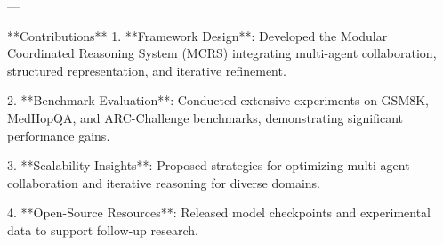 ---

**Contributions**  
1. **Framework Design**: Developed the Modular Coordinated Reasoning System (MCRS) integrating multi-agent collaboration, structured representation, and iterative refinement.

2. **Benchmark Evaluation**: Conducted extensive experiments on GSM8K, MedHopQA, and ARC-Challenge benchmarks, demonstrating significant performance gains.

3. **Scalability Insights**: Proposed strategies for optimizing multi-agent collaboration and iterative reasoning for diverse domains.

4. **Open-Source Resources**: Released model checkpoints and experimental data to support follow-up research.  

